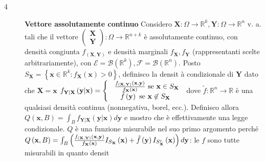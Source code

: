 \documentclass{article}
\begin{document}
\begin{description}
\item[4] \textbf{Vettore assolutamente continuo} Considero $\mathbf{X}%
:\Omega \rightarrow 
\mathbb{R}
^{k},\mathbf{Y}:\Omega \rightarrow 
\mathbb{R}
^{n}$ v. a. tali che il vettore $\left( 
\begin{array}{c}
\mathbf{X} \\ 
\mathbf{Y}%
\end{array}%
\right) :\Omega \rightarrow 
\mathbb{R}
^{n+k}$ \`{e} assolutamente continuo, con densit\`{a} congiunta $f_{\left( 
\mathbf{X,Y}\right) }$ e densit\`{a} marginali $f_{\mathbf{X}},f_{\mathbf{Y}%
} $ (rappresentanti scelte arbitrariamente), con $\mathcal{E=B}\left( 
\mathbb{R}
^{k}\right) ,\mathcal{F=B}\left( 
\mathbb{R}
^{n}\right) $. Posto $S_{\mathbf{X}}=\left\{ \mathbf{x}\in 
\mathbb{R}
^{k}:f_{\mathbf{X}}\left( \mathbf{x}\right) >0\right\} $, definisco la densit%
\`{a} condizionale di $\mathbf{Y}$ dato che $\mathbf{X=x}$ $f_{\mathbf{Y|X}%
}\left( \mathbf{y|x}\right) =\left\{ 
\begin{array}{c}
\text{\textbf{\ }}\frac{f_{\left( \mathbf{X,Y}\right) }\left( \mathbf{x,y}%
\right) }{f_{\mathbf{X}}\left( \mathbf{x}\right) }\text{ se }\mathbf{x}\in
S_{\mathbf{X}} \\ 
\tilde{f}\left( \mathbf{y}\right) \text{ se }\mathbf{x}\not\in S_{\mathbf{X}}%
\end{array}%
\right. $ dove $\tilde{f}:%
\mathbb{R}
^{n}\rightarrow 
\mathbb{R}
$ \`{e} una qualsiasi densit\`{a} continua (nonnegativa, borel, ecc.).
Definisco allora $Q\left( \mathbf{x},B\right) =\int_{B}f_{\mathbf{Y|X}%
}\left( \mathbf{y|x}\right) d\mathbf{y}$ e mostro che \`{e} effettivamente
una legge condizionale. $Q$ \`{e} una funzione misurabile nel suo primo
argomento perch\'{e} $Q\left( \mathbf{x},B\right) =\int_{B}\left( \frac{%
f_{\left( \mathbf{X,Y}\right) }\left( \mathbf{x,y}\right) }{f_{\mathbf{X}%
}\left( \mathbf{x}\right) }I_{S_{\mathbf{X}}}\left( \mathbf{x}\right) +%
\tilde{f}\left( \mathbf{y}\right) I_{S_{\mathbf{X}}^{c}}\left( \mathbf{x}%
\right) \right) d\mathbf{y}$: le $f$ sono tutte misurabili in quanto densit%

\end{description}
\end{document}
